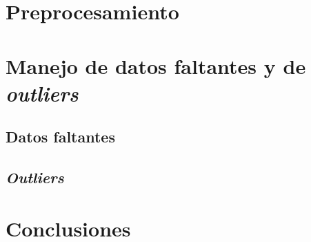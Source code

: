 \documentclass[10pt]{article}
\begin{document}
\section{Preprocesamiento}


\section{Manejo de datos faltantes y de \textit{outliers}}
\subsection{Datos faltantes}\label{subsec:missing}



\subsection{\textit{Outliers}}

\section{Conclusiones}
\end{document}
